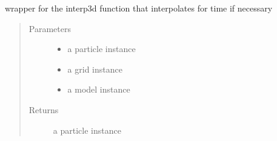 \documentclass[letterpaper,10pt,english]{sphinxmanual}
\begin{document}

\begin{fulllineitems}
\label{\detokenize{octapy:octapy.tracking.get_physical}}
\sphinxAtStartPar
wrapper for the interp3d function that interpolates for time if
necessary
\begin{quote}\begin{description}
\item[{Parameters}] \leavevmode\begin{itemize}
\item {} 
\sphinxAtStartPar
{} \textendash{} a particle instance

\item {} 
\sphinxAtStartPar
{} \textendash{} a grid instance

\item {} 
\sphinxAtStartPar
{} \textendash{} a model instance

\end{itemize}

\item[{Returns}] \leavevmode
\sphinxAtStartPar
a particle instance

\end{description}\end{quote}

\end{fulllineitems}

\end{document}
